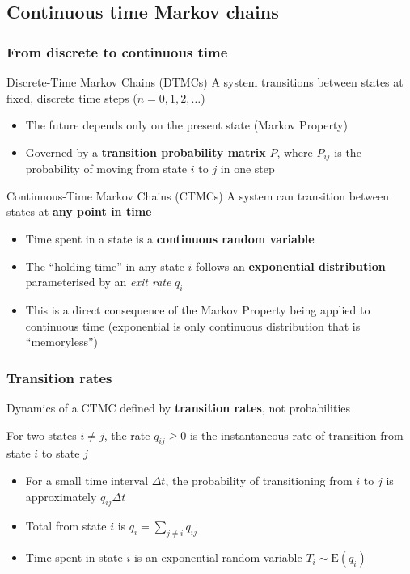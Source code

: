 \documentclass[aspectratio=169]{beamer}\usepackage[]{graphicx}\usepackage[]{xcolor}
\begin{document}
\subsection{Continuous time Markov chains}
\begin{frame}
    \frametitle{From discrete to continuous time}
    \begin{block}{Discrete-Time Markov Chains (DTMCs)}
        A system transitions between states at fixed, discrete time steps ($n=0, 1, 2, \dots$)
        \begin{itemize}
            \item The future depends only on the present state (Markov Property)
            \item Governed by a \textbf{transition probability matrix} $P$, where $P_{ij}$ is the probability of moving from state $i$ to $j$ in one step
        \end{itemize}
    \end{block}
    
    \begin{block}{Continuous-Time Markov Chains (CTMCs)}
        A system can transition between states at \textbf{any point in time}
        \begin{itemize}
            \item Time spent in a state is a \textbf{continuous random variable}
            \item The ``holding time'' in any state $i$ follows an \textbf{exponential distribution} parameterised by an \textit{exit rate} $q_i$
            \item This is a direct consequence of the Markov Property being applied to continuous time (exponential is only continuous distribution that is ``memoryless'')
        \end{itemize}
    \end{block}
\end{frame}

\begin{frame}
    \frametitle{Transition rates}
    Dynamics of a CTMC defined by \textbf{transition rates}, not probabilities

    \begin{definition}
        For two states $i \neq j$, the rate $q_{ij} \ge 0$ is the instantaneous rate of transition from state $i$ to state $j$
        \begin{itemize}
            \item For a small time interval $\Delta t$, the probability of transitioning from $i$ to $j$ is approximately $q_{ij} \Delta t$
            \item Total  from state $i$ is $q_i = \sum_{j \neq i} q_{ij}$
            \item Time spent in state $i$ is an exponential random variable $T_i \sim \text{E}(q_i)$
        \end{itemize}
    \end{definition}
\end{frame}
    
\end{document}
